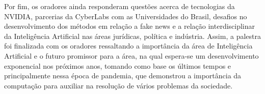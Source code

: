 Por fim, os oradores ainda responderam questões acerca de tecnologias da NVIDIA, parcerias da CyberLabs com as Universidades do Brasil, desafios no desenvolvimento dos métodos em relação a fake news e a relação interdisciplinar da Inteligência Artificial nas áreas jurídicas, política e indústria. Assim, a palestra foi finalizada com os oradores ressaltando a importância da área de Inteligência Artificial e o futuro promissor para a área, na qual espera-se um desenvolvimento exponencial nos próximos anos, tomando como base os últimos tempos e principalmente nessa época de pandemia, que demonstrou a importância da computação para auxiliar na resolução de vários problemas da sociedade.
